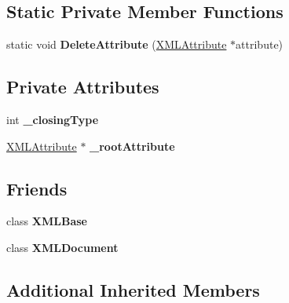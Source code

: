 \subsection*{Static Private Member Functions}
\begin{DoxyCompactItemize}
\item 
static void {\bfseries Delete\+Attribute} (\hyperlink{classtinyxml2_1_1_x_m_l_attribute}{X\+M\+L\+Attribute} $\ast$attribute)\hypertarget{classtinyxml2_1_1_x_m_l_element_af6af63c153c343cc71638375c4a2085d}{}\label{classtinyxml2_1_1_x_m_l_element_af6af63c153c343cc71638375c4a2085d}

\end{DoxyCompactItemize}
\subsection*{Private Attributes}
\begin{DoxyCompactItemize}
\item 
int {\bfseries \+\_\+closing\+Type}\hypertarget{classtinyxml2_1_1_x_m_l_element_ad6dbc2ecd157801ddc9bba7c3572796b}{}\label{classtinyxml2_1_1_x_m_l_element_ad6dbc2ecd157801ddc9bba7c3572796b}

\item 
\hyperlink{classtinyxml2_1_1_x_m_l_attribute}{X\+M\+L\+Attribute} $\ast$ {\bfseries \+\_\+root\+Attribute}\hypertarget{classtinyxml2_1_1_x_m_l_element_ad067115a9f42b2df1fcdf3e0355f2789}{}\label{classtinyxml2_1_1_x_m_l_element_ad067115a9f42b2df1fcdf3e0355f2789}

\end{DoxyCompactItemize}
\subsection*{Friends}
\begin{DoxyCompactItemize}
\item 
class {\bfseries X\+M\+L\+Base}\hypertarget{classtinyxml2_1_1_x_m_l_element_a449202cfc89e7ae5c2f81995476f9ec1}{}\label{classtinyxml2_1_1_x_m_l_element_a449202cfc89e7ae5c2f81995476f9ec1}

\item 
class {\bfseries X\+M\+L\+Document}\hypertarget{classtinyxml2_1_1_x_m_l_element_a4eee3bda60c60a30e4e8cd4ea91c4c6e}{}\label{classtinyxml2_1_1_x_m_l_element_a4eee3bda60c60a30e4e8cd4ea91c4c6e}

\end{DoxyCompactItemize}
\subsection*{Additional Inherited Members}


